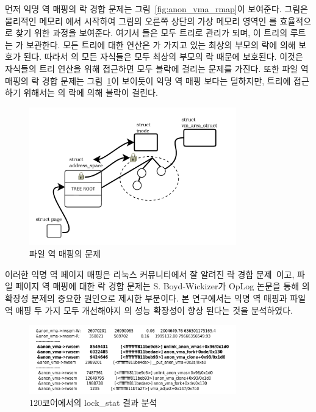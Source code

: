 먼저 익명 역 매핑의 락 경합 문제는 그림~\ref{fig:anon_vma_rmap}이 보여준다.
그림은 물리적인 메모리 에서 시작하여 그림의 오른쪽 상단의 
가상 메모리 영역인 를 효율적으로 찾기 위한 과정을 보여준다. 
여기서 들은 모두 트리로 관리가 되며, 이 트리의 루트는
가 보관한다. 
모든 트리에 대한 연산은 가 가지고 있는 최상의 부모의 락에 의해 보호가 된다. 
따라서 의 모든 자식들은 모두 최상의 부모의 락 때문에 보호된다.
이것은 자식들의 트리 연산을 위해 접근하면 모두 블락에 걸리는 문제를 가진다. 
또한 파일 역 매핑의 락 경합 문제는 그림~\ref{fig:file_rmap_default}이 보이듯이 
익명 역 매핑 보다는 덜하지만, 트리에 접근하기 위해서는 의 락에 의해 
블락이 걸린다.

 \begin{figure}[h]
    \centering
    \includegraphics[width=0.8\textwidth]{fig/file_rmap_default}
    \caption{파일 역 매핑의 문제}
  \label{fig:file_rmap_default}
\end{figure}

이러한 익명 역 페이지 매핑은 리눅스 커뮤니티에서 잘 알려진 락 경합 문제~\cite{Andi2011adding}이고, 
파일 페이지 역 매핑에 대한 락 경합 문제는 S. Boyd-Wickizer가 OpLog 논문을 통해 의 확장성 
문제의 중요한 원인으로 제시한 부분이다.
본 연구에서는 익명 역 매핑과 파일 역 매핑 두 가지 모두 개선해야지 의 성능 확장성이 
향상 된다는 것을 분석하였다. 

\begin{figure}[h]
    \centering
    \includegraphics[width=0.8\textwidth]{fig/anon_vma_func}
    \caption{120코어에서의 lock\_stat 결과 분석}
  \label{fig:anon_vma_func}
\end{figure}

